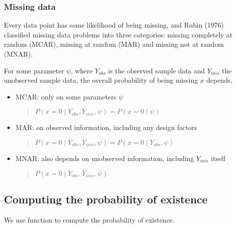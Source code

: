 \documentclass[a4paper,12pt,english]{sphinxhowto}
\begin{document}
\subsubsection{Missing data}
\label{\detokenize{Uncertainty:missing-data}}
Every data point has some likelihood of being missing, and Rubin (1976) classified missing data problems
into three categories: missing completely at random (MCAR), missing at random (MAR) and missing not at random (MNAR).

For some parameter \(\psi\), where \(Y_{obs}\) is the observed sample data and \(Y_{mis}\) the unobserved sample data,
the overall probability of being missing \(x\) depends,
\begin{itemize}
\item {} 
MCAR: only on some parameters \(\psi\)
\begin{quote}

\(P(x=0 \mid Y_{obs}, Y_{mis}, \psi) = P(x=0 \mid \psi)\)
\end{quote}

\item {} 
MAR: on observed information, including any design factors
\begin{quote}

\(P(x=0 \mid Y_{obs}, Y_{mis}, \psi) = P(x=0 \mid Y_{obs}, \psi)\)
\end{quote}

\item {} 
MNAR: also depends on unobserved information, including \(Y_{mis}\) itself
\begin{quote}

\(P(x=0 \mid Y_{obs}, Y_{mis}, \psi)\)
\end{quote}

\end{itemize}

\begin{quote}




{\hyperref[\detokenize{EDHVariables:ccases}]{}}


\end{quote}



\subsection{Computing the probability of existence}
\label{\detokenize{Uncertainty:computing-the-probability-of-existence}}\label{\detokenize{Uncertainty:cprex}}
We use function  to compute the probability of existence.
\end{document}
